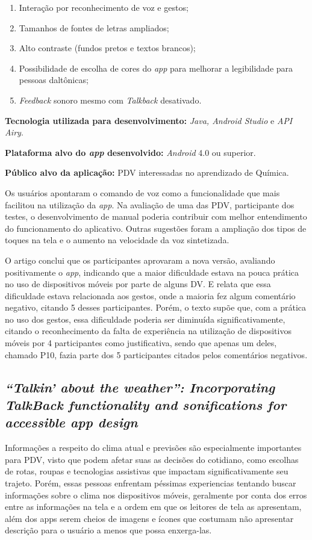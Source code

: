 \begin{enumerate}
\item Interação por reconhecimento de voz e gestos;
\item Tamanhos de fontes de letras ampliados;
\item Alto contraste (fundos pretos e textos brancos);
\item Possibilidade de escolha de cores do \emph{app} para melhorar a legibilidade para pessoas daltônicas;
\item \emph{Feedback} sonoro mesmo com \emph{Talkback} desativado.
\end{enumerate}

\textbf{Tecnologia utilizada para desenvolvimento:} \emph{Java, Android Studio} e \emph{API Airy}.

\textbf{Plataforma alvo do \emph{app} desenvolvido:} \emph{Android} 4.0 ou superior.

\textbf{Público alvo da aplicação:} PDV interessadas no aprendizado de Química\@.

Os usuários apontaram o comando de voz como a funcionalidade que mais facilitou na utilização da \emph{app}.
Na avaliação de uma das PDV, participante dos testes, o desenvolvimento de manual poderia contribuir com melhor entendimento do funcionamento do aplicativo.
Outras sugestões foram a ampliação dos tipos de toques na tela e o aumento na velocidade da voz sintetizada.

O artigo conclui que os participantes aprovaram a nova versão, avaliando positivamente o \emph{app}, indicando que a maior dificuldade estava na pouca prática no uso de dispositivos móveis por parte de alguns DV\@.
E relata que essa dificuldade estava relacionada aos gestos, onde a maioria fez algum comentário negativo, citando 5 desses participantes.
Porém, o texto supõe que, com a prática no uso dos gestos, essa dificuldade poderia ser diminuída significativamente, citando o reconhecimento da falta de experiência na utilização de dispositivos móveis por 4 participantes como justificativa, sendo que apenas um deles, chamado P10, fazia parte dos 5 participantes citados pelos comentários negativos.

\subsection{\emph{``Talkin' about the weather'': Incorporating TalkBack functionality and sonifications for accessible app design}}

Informações a respeito do clima atual e previsões são especialmente importantes para PDV, visto que podem afetar suas as decisões do cotidiano, como escolhas de rotas, roupas e tecnologias assistivas que impactam significativamente seu trajeto.
Porém, essas pessoas enfrentam péssimas experiencias tentando buscar informações sobre o clima nos dispositivos móveis, geralmente por conta dos erros entre as informações na tela e a ordem em que os leitores de tela as apresentam, além dos apps serem cheios de imagens e ícones que costumam não apresentar descrição para o usuário a menos que possa enxerga-las.


